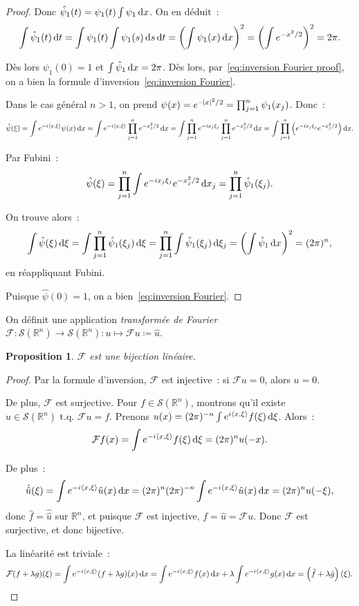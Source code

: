 \documentclass{report}
\newcommand{\R}{{\mathbb R}}
\newcommand{\scpr}[2]{\left\langle#1, #2\right\rangle}
\newcommand{\tq}{\text{ t.q. }}
\newcommand{\dx}{\dif x}
\newtheorem{prp}[thm]{Proposition}
\theoremstyle{definition}
\theoremstyle{remark}
\begin{document}
\begin{proof}
Donc $\hat \psi_1(t) = \psi_1(t)\int\psi_1\dx$. On en déduit~:
\[\int \hat \psi_1(t)\dif t = \int\psi_1(t)\int\psi_1(s)\dif s\dif t = \left(\int \psi_1(x)\dx\right)^2 = \left(\int e^{-x^2/2}\right)^2 = 2\pi.\]

Dès lors $\psi_1(0) = 1$ et $\int\hat\psi_1\dx = 2\pi$. Dès lors, par~\eqref{eq:inversion Fourier proof}, on a bien la formule d'inversion~\eqref{eq:inversion Fourier}.

Dans le cas général $n > 1$, on prend $\psi(x) = e^{-\abs x^2/2} = \prod_{j=1}^n\psi_1(x_j)$. Donc~:
\[\hat\psi(\xi) = \int e^{-i\scpr x\xi}\psi(x)\dx = \int e^{-i\scpr x\xi}\prod_{j=1}^ne^{-x_j^2/2}\dx = \int\prod_{j=1}^ne^{-ix_j\xi_j}\prod_{j=1}^ne^{-x_j^2/2}\dx
	= \int\prod_{j=1}^n\left(e^{-ix_j\xi_j}e^{-x_j^2/2}\right)\dx.\]

Par Fubini~:
\[\hat\psi(\xi) = \prod_{j=1}^n\int e^{-ix_j\xi_j}e^{-x_j^2/2}\dx_j = \prod_{j=1}^n\hat \psi_1(\xi_j).\]

On trouve alors~:
\[\int \hat \psi(\xi)\dif\xi = \int \prod_{j=1}^n\hat\psi_1(\xi_j)\dif\xi = \prod_{j=1}^n\int\hat \psi_1(\xi_j)\dif\xi_j = \left(\int \hat\psi_1\dif x\right)^2 = (2\pi)^n,\]
en réappliquant Fubini.

Puisque $\hat \psi(0) = 1$, on a bien~\eqref{eq:inversion Fourier}.
\end{proof}

On définit une application \textit{transformée de Fourier} $\mathcal F : \mathcal S(\R^n) \to \mathcal S(\R^n) : u \mapsto \mathcal Fu \coloneqq \hat u$.

\begin{prp} $\mathcal F$ est une bijection linéaire.
\end{prp}

\begin{proof} Par la formule d'inversion, $\mathcal F$ est injective~: si $\mathcal Fu = 0$, alors $u = 0$.

De plus, $\mathcal F$ est surjective. Pour $f \in \mathcal S(\R^n)$, montrons qu'il existe $u \in \mathcal S(\R^n) \tq \mathcal Fu = f$.
Prenons $u(x) = (2\pi)^{-n}\int e^{i\scpr x\xi}f(\xi)\dif\xi$. Alors~:
\[\mathcal Ff(x) = \int e^{-i\scpr x\xi}f(\xi)\dif\xi = (2\pi)^nu(-x).\]

De plus~:
\[\hat {\hat u}(\xi) = \int e^{-i\scpr x\xi}\hat u(x)\dx = (2\pi)^n(2\pi)^{-n}\int e^{-i\scpr x\xi}\hat u(x)\dx = (2\pi)^nu(-\xi),\]
donc $\hat f = \hat {\hat u}$ sur $\R^n$, et puisque $\mathcal F$ est injective, $f = \hat u = \mathcal Fu$. Donc $\mathcal F$ est surjective, et donc bijective.

La linéarité est triviale~:
\[\mathcal F(f+\lambda g)(\xi) = \int e^{-i\scpr x\xi}(f+\lambda g)(x)\dx = \int e^{-i\scpr x\xi}f(x)\dx + \lambda\int e^{-i\scpr x\xi}g(x)\dx
	= \left(\hat f + \lambda \hat g\right)(\xi).\]
\end{proof}
\end{document}
